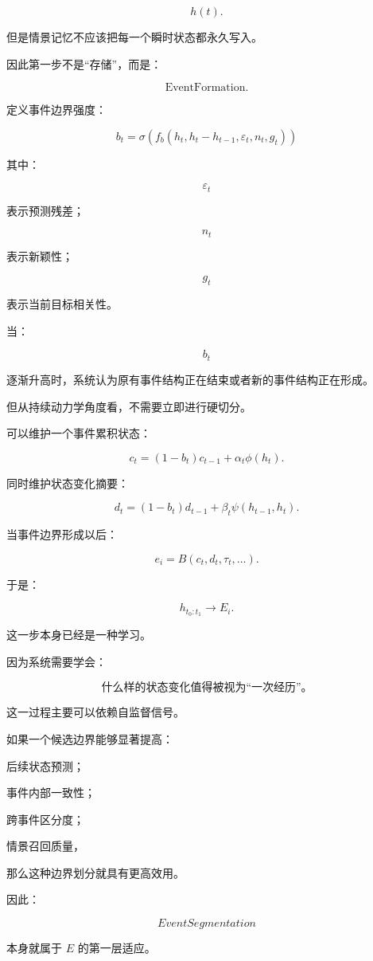 \[
h(t).
\]

但是情景记忆不应该把每一个瞬时状态都永久写入。

因此第一步不是“存储”，而是：

\[
\boxed{
\text{EventFormation}.
}
\]

定义事件边界强度：

\[
b_t
=
\sigma
\left(
f_b
\left(
h_t,
h_t-h_{t-1},
\varepsilon_t,
n_t,
g_t
\right)
\right)
\]

其中：

\[
\varepsilon_t
\]

表示预测残差；

\[
n_t
\]

表示新颖性；

\[
g_t
\]

表示当前目标相关性。

当：

\[
b_t
\]

逐渐升高时，系统认为原有事件结构正在结束或者新的事件结构正在形成。

但从持续动力学角度看，不需要立即进行硬切分。

可以维护一个事件累积状态：

\[
c_t
=
(1-b_t)c_{t-1}
+
\alpha_t\phi(h_t).
\]

同时维护状态变化摘要：

\[
d_t
=
(1-b_t)d_{t-1}
+
\beta_t
\psi(h_{t-1},h_t).
\]

当事件边界形成以后：

\[
\boxed{
e_i
=
B(c_t,d_t,\tau_t,\ldots).
}
\]

于是：

\[
\boxed{
h_{t_0:t_1}
\rightarrow
E_i.
}
\]

这一步本身已经是一种学习。

因为系统需要学会：

\[
\boxed{
\text{什么样的状态变化值得被视为“一次经历”。}
}
\]

这一过程主要可以依赖自监督信号。

如果一个候选边界能够显著提高：

后续状态预测；

事件内部一致性；

跨事件区分度；

情景召回质量，

那么这种边界划分就具有更高效用。

因此：

\[
\boxed{
EventSegmentation
}
\]

本身就属于 \(E\) 的第一层适应。


